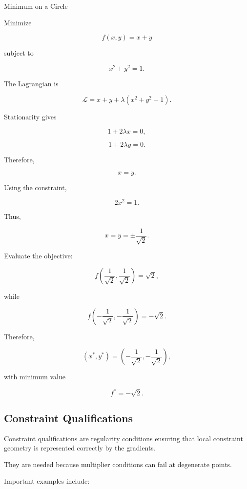 \begin{workedexamplebox}{Minimum on a Circle}

Minimize

\[
f(x,y)=x+y
\]

subject to

\[
x^2+y^2=1.
\]

The Lagrangian is

\[
\mathcal{L}
=
x+y
+
\lambda
(
x^2+y^2-1
).
\]

Stationarity gives

\[
1+2\lambda x=0,
\]

\[
1+2\lambda y=0.
\]

Therefore,

\[
x=y.
\]

Using the constraint,

\[
2x^2=1.
\]

Thus,

\[
x=y=\pm\frac1{\sqrt2}.
\]

Evaluate the objective:

\[
f
\left(
\frac1{\sqrt2},
\frac1{\sqrt2}
\right)
=
\sqrt2,
\]

while

\[
f
\left(
-\frac1{\sqrt2},
-\frac1{\sqrt2}
\right)
=
-\sqrt2.
\]

Therefore,

\begin{answerbox}
\[
\boxed{
(x^*,y^*)
=
\left(
-\frac1{\sqrt2},
-\frac1{\sqrt2}
\right),
}
\]

with minimum value

\[
\boxed{
f^*=-\sqrt2.
}
\]
\end{answerbox}

\end{workedexamplebox}

\subsection{Constraint Qualifications}
\label{subsec:nlp-constraint-qualifications}

Constraint qualifications are regularity conditions ensuring that local
constraint geometry is represented correctly by the gradients.

They are needed because multiplier conditions can fail at degenerate
points.

Important examples include:

